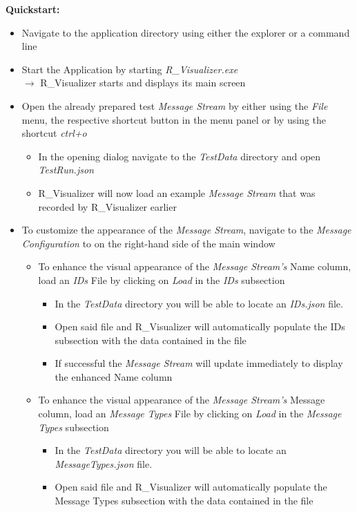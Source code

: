\documentclass[12pt,a4paper]{scrartcl}
\begin{document}
\textbf{Quickstart:}
\begin{itemize}
	\item Navigate to the application directory using either the explorer or a command line
	\item Start the Application by starting \textit{R\_Visualizer.exe}\\
	$\rightarrow$ R\_Visualizer starts and displays its main screen
	\item Open the already prepared test \textit{Message Stream} by either using the \textit{File} menu, the respective shortcut button in the menu panel or by using the shortcut \textit{ctrl+o}
	\begin{itemize}
	\item In the opening dialog navigate to the \textit{TestData} directory and open \textit{TestRun.json}
	\item R\_Visualizer will now load an example \textit{Message Stream} that was recorded by R\_Visualizer earlier
	\end{itemize}
	\item To customize the appearance of the \textit{Message Stream}, navigate to the \textit{Message Configuration} to on the right-hand side of the main window
	\begin{itemize}
		\item To enhance the visual appearance of the \textit{Message Stream's} Name column, load an \textit{IDs} File by clicking on \textit{Load} in the \textit{IDs} subsection
		\begin{itemize}
			\item In the \textit{TestData} directory you will be able to locate an \textit{IDs.json} file.
			\item Open said file and R\_Visualizer will automatically populate the IDs subsection with the data contained in the file
			\item If successful the \textit{Message Stream} will update immediately to display the enhanced Name column
		\end{itemize}
		\item To enhance the visual appearance of the \textit{Message Stream's} Message column, load an \textit{Message Types} File by clicking on \textit{Load} in the \textit{Message Types} subsection
		\begin{itemize}
			\item In the \textit{TestData} directory you will be able to locate an \textit{MessageTypes.json} file.
			\item Open said file and R\_Visualizer will automatically populate the Message Types subsection with the data contained in the file

\end{itemize}
\end{itemize}
\end{itemize}
\end{document}
